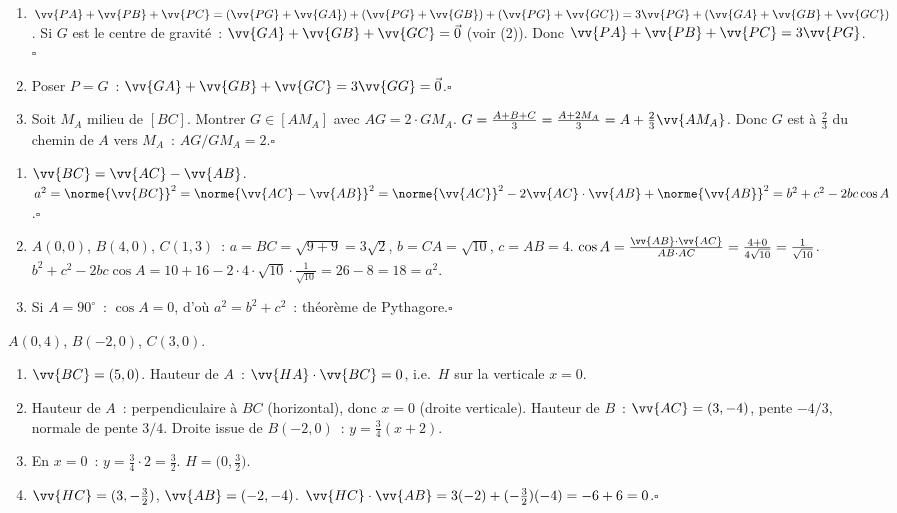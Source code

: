 
\begin{enumerate}
  \item $\vv{PA}+\vv{PB}+\vv{PC}
        =(\vv{PG}+\vv{GA})+(\vv{PG}+\vv{GB})+(\vv{PG}+\vv{GC})
        =3\vv{PG}+(\vv{GA}+\vv{GB}+\vv{GC})$.
        Si $G$ est le centre de gravité~: $\vv{GA}+\vv{GB}+\vv{GC}=\vec{0}$ (voir (2)).
        Donc $\vv{PA}+\vv{PB}+\vv{PC}=3\vv{PG}$.\hfill$\square$
  \item Poser $P=G$~: $\vv{GA}+\vv{GB}+\vv{GC}=3\vv{GG}=\vec{0}$.\hfill$\square$
  \item Soit $M_A$ milieu de $[BC]$. Montrer $G\in[AM_A]$ avec $AG=2\cdot GM_A$.
        $G=\frac{A+B+C}{3}=\frac{A+2M_A}{3}=A+\frac{2}{3}\vv{AM_A}$.
        Donc $G$ est \`a $\frac{2}{3}$ du chemin de $A$ vers $M_A$~:
        $AG/GM_A=2$.\hfill$\square$
\end{enumerate}


\begin{enumerate}
  \item $\vv{BC}=\vv{AC}-\vv{AB}$.
        $a^2=\norme{\vv{BC}}^2=\norme{\vv{AC}-\vv{AB}}^2
        =\norme{\vv{AC}}^2-2\vv{AC}\cdot\vv{AB}+\norme{\vv{AB}}^2
        =b^2+c^2-2bc\cos A$.\hfill$\square$
  \item $A(0,0)$, $B(4,0)$, $C(1,3)$~: $a=BC=\sqrt{9+9}=3\sqrt{2}$,
        $b=CA=\sqrt{10}$, $c=AB=4$.
        $\cos A=\frac{\vv{AB}\cdot\vv{AC}}{AB\cdot AC}=\frac{4+0}{4\sqrt{10}}=\frac{1}{\sqrt{10}}$.
        $b^2+c^2-2bc\cos A=10+16-2\cdot4\cdot\sqrt{10}\cdot\frac{1}{\sqrt{10}}=26-8=18=a^2$.\checkmark
  \item Si $A=90^{\circ}$~: $\cos A=0$, d'o\`u $a^2=b^2+c^2$~: th\'eor\`eme de Pythagore.\hfill$\square$
\end{enumerate}


$A(0,4)$, $B(-2,0)$, $C(3,0)$.
\begin{enumerate}
  \item $\vv{BC}=(5,0)$. Hauteur de $A$~: $\vv{HA}\cdot\vv{BC}=0$, i.e.\ $H$ sur la verticale $x=0$.
  \item Hauteur de $A$~: perpendiculaire \`a $BC$ (horizontal), donc $x=0$ (droite verticale).
        Hauteur de $B$~: $\vv{AC}=(3,-4)$, pente $-4/3$, normale de pente $3/4$.
        Droite issue de $B(-2,0)$~: $y=\frac{3}{4}(x+2)$.
  \item En $x=0$~: $y=\frac{3}{4}\cdot2=\frac{3}{2}$. $H=\bigl(0,\frac{3}{2}\bigr)$.
  \item $\vv{HC}=(3,-\frac{3}{2})$, $\vv{AB}=(-2,-4)$.
        $\vv{HC}\cdot\vv{AB}=3(-2)+(-\frac{3}{2})(-4)=-6+6=0$.\checkmark\hfill$\square$
\end{enumerate}

